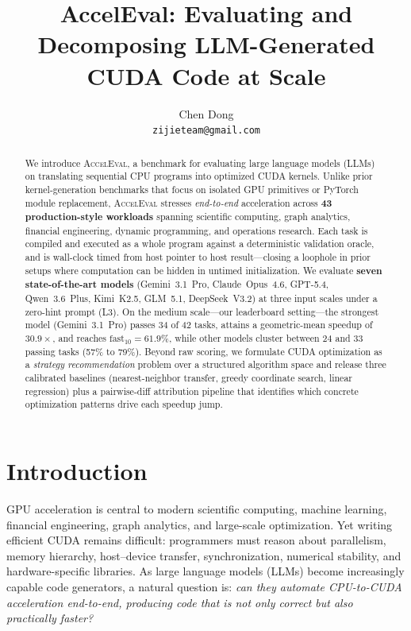 \documentclass{article}
\title{AccelEval: Evaluating and Decomposing LLM-Generated CUDA Code at Scale}
\author{%
  Chen Dong \\
  \texttt{zijieteam@gmail.com} \\
}
\begin{document}
\maketitle


\begin{abstract}
We introduce \textsc{AccelEval}, a benchmark for evaluating large language models (LLMs) on translating sequential CPU programs into optimized CUDA kernels. Unlike prior kernel-generation benchmarks that focus on isolated GPU primitives or PyTorch module replacement, \textsc{AccelEval} stresses \emph{end-to-end} acceleration across \textbf{43 production-style workloads} spanning scientific computing, graph analytics, financial engineering, dynamic programming, and operations research. Each task is compiled and executed as a whole program against a deterministic validation oracle, and is wall-clock timed from host pointer to host result---closing a loophole in prior setups where computation can be hidden in untimed initialization. We evaluate \textbf{seven state-of-the-art models} (Gemini~3.1~Pro, Claude~Opus~4.6, GPT-5.4, Qwen~3.6~Plus, Kimi~K2.5, GLM~5.1, DeepSeek~V3.2) at three input scales under a zero-hint prompt (L3). On the medium scale---our leaderboard setting---the strongest model (Gemini~3.1~Pro) passes 34 of 42 tasks, attains a geometric-mean speedup of $30.9\times$, and reaches $\mathrm{fast}_{10}=61.9\%$, while other models cluster between 24 and 33 passing tasks (57\% to 79\%). Beyond raw scoring, we formulate CUDA optimization as a \emph{strategy recommendation} problem over a structured algorithm space and release three calibrated baselines (nearest-neighbor transfer, greedy coordinate search, linear regression) plus a pairwise-diff attribution pipeline that identifies which concrete optimization patterns drive each speedup jump.
\end{abstract}



\section{Introduction}
\label{sec:intro}

GPU acceleration is central to modern scientific computing, machine learning, financial engineering, graph analytics, and large-scale optimization. Yet writing efficient CUDA remains difficult: programmers must reason about parallelism, memory hierarchy, host--device transfer, synchronization, numerical stability, and hardware-specific libraries. As large language models (LLMs) become increasingly capable code generators, a natural question is: \emph{can they automate CPU-to-CUDA acceleration end-to-end, producing code that is not only correct but also practically faster?}
\end{document}
